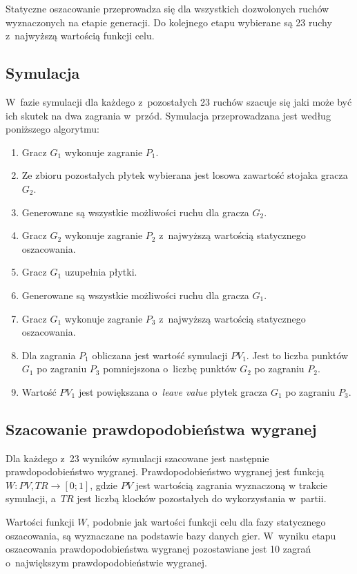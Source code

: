 \documentclass[a4paper,twocolumn,11pt]{article}
\theoremstyle{definition}
\begin{document}
Statyczne oszacowanie przeprowadza się dla wszystkich dozwolonych ruchów wyznaczonych na etapie generacji. Do kolejnego etapu wybierane są 23 ruchy z~najwyższą wartością funkcji celu.

\subsection{Symulacja}

W~fazie symulacji dla każdego z~pozostałych 23 ruchów szacuje się jaki może być ich skutek na dwa zagrania w~przód. Symulacja przeprowadzana jest według poniższego algorytmu:

\begin{enumerate}
	\item Gracz $G_{1}$ wykonuje zagranie $P_{1}$.
	\item Ze zbioru pozostałych płytek wybierana jest losowa zawartość stojaka gracza $G_{2}$.
	\item Generowane są wszystkie możliwości ruchu dla gracza $G_{2}$.
	\item Gracz $G_{2}$ wykonuje zagranie $P_{2}$ z~najwyższą wartością statycznego oszacowania.
	\item Gracz $G_{1}$ uzupełnia płytki. 
	\item Generowane są wszystkie możliwości ruchu dla gracza $G_{1}$.
	\item Gracz $G_{1}$ wykonuje zagranie $P_{3}$ z~najwyższą wartością statycznego oszacowania.
	\item Dla zagrania $P_{1}$ obliczana jest wartość symulacji $PV_{1}$. Jest to liczba punktów $G_{1}$ po zagraniu $P_{3}$ pomniejszona o~liczbę punktów $G_{2}$ po zagraniu $P_{2}$.
	\item Wartość $PV_{1}$ jest powiększana o~\emph{leave value} płytek gracza $G_{1}$ po zagraniu $P_{3}$.
\end{enumerate}

\subsection{Szacowanie prawdopodobieństwa wygranej}

Dla każdego z~23 wyników symulacji szacowane jest następnie prawdopodobieństwo wygranej. Prawdopodobieństwo wygranej jest funkcją $W: PV, TR \rightarrow [0;1]$, gdzie $PV$ jest wartością zagrania wyznaczoną w trakcie symulacji, a~$TR$ jest liczbą klocków pozostałych do wykorzystania w~partii. 

Wartości funkcji $W$, podobnie jak wartości funkcji celu dla fazy statycznego oszacowania, są wyznaczane na podstawie bazy danych gier. W~wyniku etapu oszacowania prawdopodobieństwa wygranej pozostawiane jest 10 zagrań o~największym prawdopodobieństwie wygranej.
\end{document}
